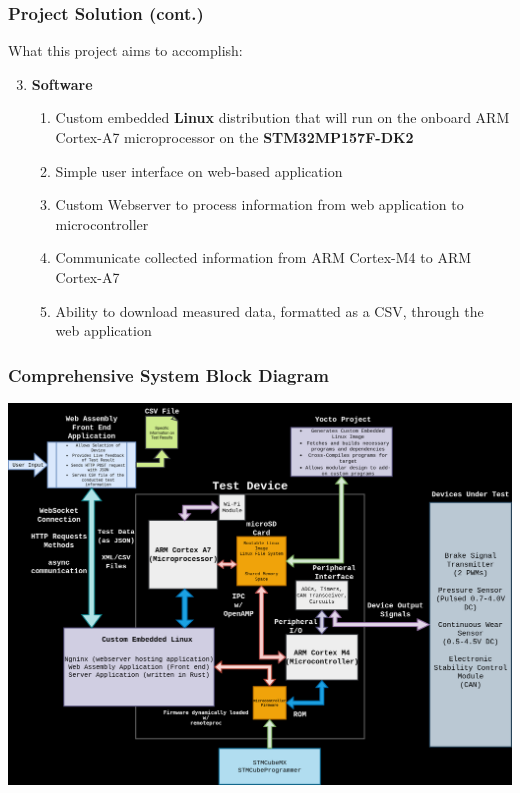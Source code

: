 \documentclass[8pt,compress,aspectratio=169]{beamer}
\newcommand\LightBold[1]{\textcolor{VSBlueLight}{\textbf{#1}}}
\newcommand\DarkBold[1]{\textcolor{VSBlueDark}{\textbf{#1}}}
\begin{document}
\begin{frame}
  \frametitle{Project Solution (cont.)}
  \begin{block}{What this project aims to accomplish:}
    \begin{enumerate}
        \setcounter{enumi}{2}
        \large
      \item \DarkBold{Software}
        \begin{enumerate}
            \large
          \item Custom embedded \textbf{Linux} distribution that will run on the onboard ARM Cortex-A7
            microprocessor on the \LightBold{STM32MP157F-DK2}
          \item Simple user interface on web-based application
          \item Custom Webserver to process information from web application to microcontroller
          \item Communicate collected information from ARM Cortex-M4 to ARM Cortex-A7
          \item Ability to download measured data, formatted as a CSV, through the web application 
        \end{enumerate}
    \end{enumerate}
  \end{block}
\end{frame}

\begin{frame}
  \frametitle{Comprehensive System Block Diagram}
  \centering
  \includegraphics[height=0.85\paperheight]{assets/diagrams/block_diagram.drawio.png}
\end{frame}
 
\end{document}
